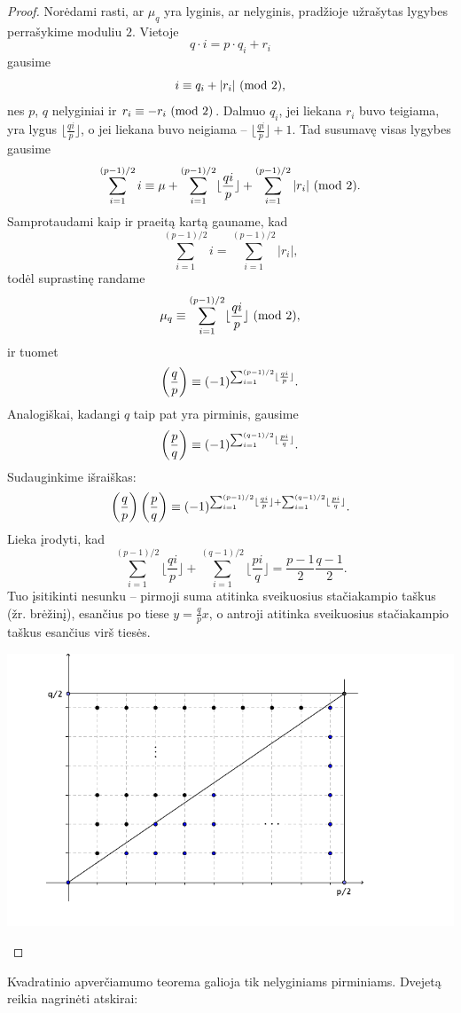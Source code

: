 \begin{proof}
Norėdami rasti, ar $\mu_q$ yra lyginis, ar nelyginis, pradžioje užrašytas
lygybes perrašykime moduliu $2$. Vietoje
$$q\cdot i = p\cdot q_i + r_i$$ 
gausime 
$$i \equiv q_i + |r_i| \ (\text{mod } 2),$$ 
nes $p$, $q$ nelyginiai ir $r_i \equiv -r_i \ (\text{mod } 2)$. Dalmuo $q_i$, jei
liekana $r_i$ buvo teigiama, yra lygus $\lfloor\frac{qi}{p}\rfloor$, o jei
liekana buvo neigiama -- $\lfloor\frac{qi}{p}\rfloor+1$. Tad susumavę visas
lygybes gausime 
$$\sum_{i=1}^{(p-1)/2}i \equiv \mu +
\sum_{i=1}^{(p-1)/2}\lfloor\frac{qi}{p}\rfloor +
\sum_{i=1}^{(p-1)/2}|r_i|\ (\text{mod } 2).$$ 
Samprotaudami kaip ir praeitą kartą gauname, kad 
$$\sum_{i=1}^{(p-1)/2}i=\sum_{i=1}^{(p-1)/2}|r_i|,$$ 
todėl suprastinę randame 
$$\mu_q \equiv \sum_{i=1}^{(p-1)/2}\lfloor\frac{qi}{p}\rfloor\ (\text{mod } 2),$$	
ir tuomet
$$\left(\frac{q}{p}\right) \equiv
(-1)^{\sum_{i=1}^{(p-1)/2}\lfloor\frac{qi}{p}\rfloor}.$$	
Analogiškai, kadangi $q$ taip pat yra pirminis, gausime
$$\left(\frac{p}{q}\right) \equiv
(-1)^{\sum_{i=1}^{(q-1)/2}\lfloor\frac{pi}{q}\rfloor}.$$	
Sudauginkime išraiškas:
$$\left(\frac{q}{p}\right)\left(\frac{p}{q}\right) \equiv
(-1)^{\sum_{i=1}^{(p-1)/2}\lfloor\frac{qi}{p}\rfloor +
\sum_{i=1}^{(q-1)/2}\lfloor\frac{pi}{q}\rfloor}.$$	
Lieka įrodyti, kad 
$$\sum_{i=1}^{(p-1)/2}\lfloor\frac{qi}{p}\rfloor +
\sum_{i=1}^{(q-1)/2}\lfloor\frac{pi}{q}\rfloor =
\frac{p-1}{2}\frac{q-1}{2}.$$
Tuo įsitikinti nesunku -- pirmoji suma atitinka sveikuosius stačiakampio
taškus (žr.  brėžinį), esančius po tiese $y=\frac{q}{p} x$, o antroji
atitinka sveikuosius stačiakampio taškus esančius virš tiesės.
\begin{center}
  \includegraphics[scale=1]{./iliustracijos/skteorija/gardele.pdf} 
\end{center}
\end{proof}

Kvadratinio apverčiamumo teorema galioja tik nelyginiams pirminiams.
Dvejetą reikia nagrinėti atskirai:

